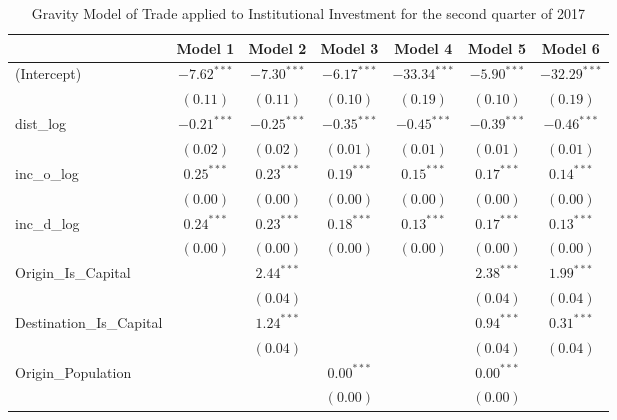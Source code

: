 \begin{table}
	\begin{center}
		\small
		\caption[Gravity Model of trade for Q2 2017]{Gravity Model of Trade applied to Institutional Investment for the second quarter of 2017}
		\begin{tabular}{l c c c c c c }
			\hline
			& Model 1 & Model 2 & Model 3 & Model 4 & Model 5 & Model 6 \\
			\hline
			(Intercept)                  & $-7.62^{***}$ & $-7.30^{***}$ & $-6.17^{***}$ & $-33.34^{***}$ & $-5.90^{***}$ & $-32.29^{***}$ \\
			& $(0.11)$      & $(0.11)$      & $(0.10)$      & $(0.19)$       & $(0.10)$      & $(0.19)$       \\
			dist\_log                    & $-0.21^{***}$ & $-0.25^{***}$ & $-0.35^{***}$ & $-0.45^{***}$  & $-0.39^{***}$ & $-0.46^{***}$  \\
			& $(0.02)$      & $(0.02)$      & $(0.01)$      & $(0.01)$       & $(0.01)$      & $(0.01)$       \\
			inc\_o\_log                  & $0.25^{***}$  & $0.23^{***}$  & $0.19^{***}$  & $0.15^{***}$   & $0.17^{***}$  & $0.14^{***}$   \\
			& $(0.00)$      & $(0.00)$      & $(0.00)$      & $(0.00)$       & $(0.00)$      & $(0.00)$       \\
			inc\_d\_log                  & $0.24^{***}$  & $0.23^{***}$  & $0.18^{***}$  & $0.13^{***}$   & $0.17^{***}$  & $0.13^{***}$   \\
			& $(0.00)$      & $(0.00)$      & $(0.00)$      & $(0.00)$       & $(0.00)$      & $(0.00)$       \\
			Origin\_Is\_Capital          &               & $2.44^{***}$  &               &                & $2.38^{***}$  & $1.99^{***}$   \\
			&               & $(0.04)$      &               &                & $(0.04)$      & $(0.04)$       \\
			Destination\_Is\_Capital     &               & $1.24^{***}$  &               &                & $0.94^{***}$  & $0.31^{***}$   \\
			&               & $(0.04)$      &               &                & $(0.04)$      & $(0.04)$       \\
			Origin\_Population           &               &               & $0.00^{***}$  &                & $0.00^{***}$  &                \\
			&               &               & $(0.00)$      &                & $(0.00)$      &                \\

\end{tabular}
\end{center}
\end{table}
